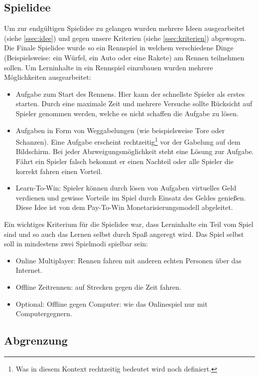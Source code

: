 \subsection{Spielidee}
	Um zur endgültigen Spielidee zu gelangen wurden mehrere Ideen ausgearbeitet (siehe \ref{ssec:idee}) und gegen unsere Kriterien (siehe \ref{ssec:kriterien}) abgewogen.
	Die Finale Spielidee wurde so ein Rennspiel in welchem verschiedene Dinge (Beispielsweise: ein Würfel, ein Auto oder eine Rakete) am Rennen teilnehmen sollen. Um Lerninhalte in ein Rennspiel einzubauen wurden mehrere Möglichkeiten ausgearbeitet:
	\begin{itemize}
		\item{ Aufgabe zum Start des Rennens. Hier kann der schnellste Spieler als erstes starten. Durch eine maximale Zeit und mehrere Versuche sollte Rücksicht auf Spieler genommen werden, welche es nicht schaffen die Aufgabe zu lösen. }
		\item{ Aufgaben in Form von Weggabelungen (wie beispielsweise Tore oder Schanzen). Eine Aufgabe erscheint rechtzeitig\footnote{Was in diesem Kontext rechtzeitig bedeutet wird noch definiert.} vor der Gabelung auf dem Bildschirm. Bei jeder Abzweigungsmöglichkeit steht eine Lösung zur Aufgabe. Fährt ein Spieler falsch  bekommt er einen Nachteil oder alle Spieler die korrekt fahren einen Vorteil. }
		\item{ Learn-To-Win: Spieler können durch lösen von Aufgaben virtuelles Geld verdienen und gewisse Vorteile im Spiel durch Einsatz des Geldes genießen. Diese Idee ist von dem Pay-To-Win Monetarisierungsmodell abgeleitet. }
	\end{itemize}
	Ein wichtiges Kriterium für die Spielidee war, dass Lerninhalte ein Teil vom Spiel sind und so auch das Lernen selbst durch Spaß angeregt wird.
	Das Spiel selbst soll in mindestens zwei Spielmodi spielbar sein:
	\begin{itemize}
		\item{ Online Multiplayer: Rennen fahren mit anderen echten Personen über das Internet. }
		\item{ Offline Zeitrennen: auf Strecken gegen die Zeit fahren. }
		\item{ Optional: Offline gegen Computer: wie das Onlinespiel nur mit Computergegnern. }
	\end{itemize}
\subsection{Abgrenzung}

